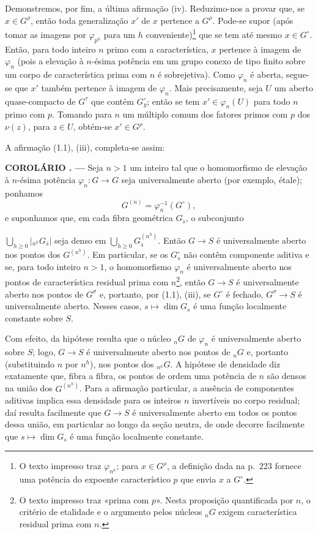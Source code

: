 \documentclass[11pt,twoside,openany]{book}
\numberwithin{equation}{section}
\newcommand{\src}[1]{%
  \phantomsection\hypertarget{src:#1}{}%
  \marginpar{\raggedleft\footnotesize\sffamily #1}%
}
\theoremstyle{plain}
\theoremstyle{definition}
\theoremstyle{remark}
\newcommand{\result}[2]{%
  \par\medskip\noindent\textbf{#1%
  \if\relax\detokenize{#2}\relax\else\space#2\fi. ---}\enspace
}
\newcommand{\FgaUnitKey}{frontmatter}
\renewcommand{\src}[1]{%
  \phantomsection\hypertarget{src:\FgaUnitKey:#1}{}%
  \marginpar{\raggedleft\footnotesize\sffamily #1}%
}
\begin{document}
Demonstremos, por fim, a última afirmação (iv). Reduzimo-nos a provar que, se
$x\in G^\rho$, então toda generalização $x'$ de $x$ pertence a $G^\rho$.
Pode-se supor (após tomar as imagens por $\varphi_{p^h}$ para um $h$
conveniente)\footnote{O texto impresso traz $\varphi_{n^h}$; para
$x\in G^\rho$, a definição dada na p.~223 fornece uma potência do expoente
característico $p$ que envia $x$ a $G^\circ$.} que se tem até mesmo
$x\in G^\circ$. Então, para todo inteiro $n$ primo com a característica, $x$
pertence à imagem de $\varphi_n$ (pois a elevação à $n$-ésima potência em um
grupo conexo de tipo finito sobre um corpo de característica prima com $n$ é
sobrejetiva). Como $\varphi_n$ é aberta, segue-se que $x'$ também pertence à
imagem de $\varphi_n$. Mais precisamente, seja $U$ um aberto quase-compacto de
$G^\tau$ que contém $G_y^\circ$; então se tem $x'\in\varphi_n(U)$ para todo
$n$ primo com $p$. Tomando para $n$ um múltiplo comum dos fatores primos com
$p$ dos $\nu(z)$, para $z\in U$, obtém-se $x'\in G^\rho$.

A afirmação (1.1), (iii), completa-se assim:

\result{COROLÁRIO}{1.5} Seja $n>1$ um inteiro tal que o homomorfismo de
elevação à $n$-ésima potência $\varphi_n:G\longrightarrow G$ seja
universalmente aberto (por exemplo, étale); ponhamos
\[
G^{(n)}=\varphi_n^{-1}(G^\circ),
\]
e suponhamos que, em cada fibra geométrica $G_{\bar s}$, o subconjunto
\src{228}
$\bigcup_{h\geq0}|{}_{n^h}G_{\bar s}|$ seja denso em
$\bigcup_{h\geq0}G_{\bar s}^{(n^h)}$. Então $G\longrightarrow S$ é universalmente aberto nos
pontos dos $G^{(n^h)}$. Em particular, se os $G_s^\circ$ não contêm componente
aditiva e se, para todo inteiro $n>1$, o homomorfismo $\varphi_n$ é
universalmente aberto nos pontos de característica residual prima com
$n$\footnote{O texto impresso traz «prima com $p$». Nesta proposição
quantificada por $n$, o critério de etalidade e o argumento pelos núcleos
${}_nG$ exigem característica residual prima com $n$.}, então
$G\longrightarrow S$ é universalmente aberto nos pontos de $G^\sigma$ e,
portanto, por (1.1), (iii), se $G^\circ$ é fechado,
$G^\sigma\longrightarrow S$ é universalmente aberto. Nesses casos,
$s\longmapsto\dim G_s$ é uma função localmente constante sobre $S$.

Com efeito, da hipótese resulta que o núcleo ${}_nG$ de $\varphi_n$ é
universalmente aberto sobre $S$; logo, $G\longrightarrow S$ é universalmente
aberto nos pontos de ${}_nG$ e, portanto (substituindo $n$ por $n^h$), nos
pontos dos ${}_{n^h}G$. A hipótese de densidade diz exatamente que, fibra a fibra, os pontos de ordem
uma potência de $n$ são densos na união dos $G^{(n^h)}$. Para a afirmação
particular, a ausência de componentes aditivas implica essa densidade para os
inteiros $n$ invertíveis no corpo residual; daí resulta facilmente que
$G\longrightarrow S$ é universalmente aberto em todos os pontos dessa união,
em particular ao longo da seção neutra, de onde decorre facilmente que
$s\longmapsto\dim G_s$ é uma função localmente constante.
\end{document}
